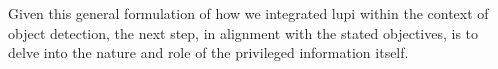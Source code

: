 Given this general formulation of how we integrated \gls{lupi} within the context of object detection, the next step, in alignment with the stated objectives, is to delve into the nature and role of the privileged information itself.








